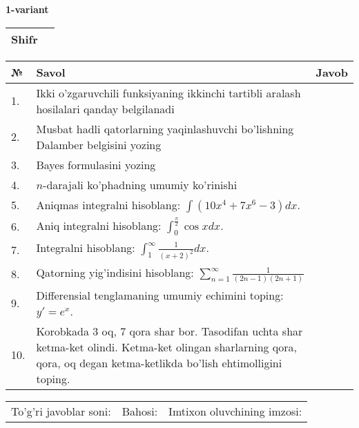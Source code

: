 \documentclass{article}
\begin{document}


  \textbf{1-variant}\\
  
  \bgroup
  \def\arraystretch{1.6} %
  
  \begin{tabular}{|m{5.7cm}|m{9.5cm}|}
  \hline
  Shifr & \\
  \hline
  \end{tabular}
  
  \vspace{1cm}
  
  \begin{tabular}{|m{0.7cm}|m{10cm}|m{4cm}|}
  \hline
  № & Savol & Javob \\
  \hline
  1. & Ikki o'zgaruvchili funksiyaning ikkinchi tartibli aralash hosilalari qanday belgilanadi &  \\
  \hline
  2. & Musbat hadli qatorlarning yaqinlashuvchi bo'lishning Dalamber belgisini yozing &  \\
  \hline
  3. & Bayes formulasini yozing &  \\
  \hline
  4. & \(n\)-darajali ko'phadning umumiy ko'rinishi &  \\
  \hline
  5. & Aniqmas integralni hisoblang: \(\int {\left( 10x^{4} + 7x^{6} - 3 \right)dx}\). &  \\
  \hline
  6. & Aniq integralni hisoblang: \(\int_{0}^{\frac{\pi}{2}}{\cos xdx}\). &  \\
  \hline
  7. & Integralni hisoblang: \(\int_{1}^{\infty}{\frac{1}{(x + 2)^{2}}dx}\). &  \\
  \hline
  8. & Qatorning yig'indisini hisoblang: \(\sum_{n = 1}^{\infty}\frac{1}{(2n - 1)(2n + 1)}\) &  \\
  \hline
  9. & Differensial tenglamaning umumiy echimini toping: \(y' = e^{x}\). &  \\
  \hline
  10. & Korobkada 3 oq, 7 qora shar bor. Tasodifan uchta shar ketma-ket olindi. Ketma-ket olingan sharlarning qora, qora, oq degan ketma-ketlikda bo'lish ehtimolligini toping. &  \\
  \hline
  \end{tabular}
  
  \vspace{1cm}
  
  \begin{tabular}{lll}
  To'g'ri javoblar soni: \underline{\hspace{1.5cm}} & 
  Bahosi: \underline{\hspace{1.5cm}} & 
  Imtixon oluvchining imzosi: \underline{\hspace{2cm}} \\
  \end{tabular}
  
\end{document}

